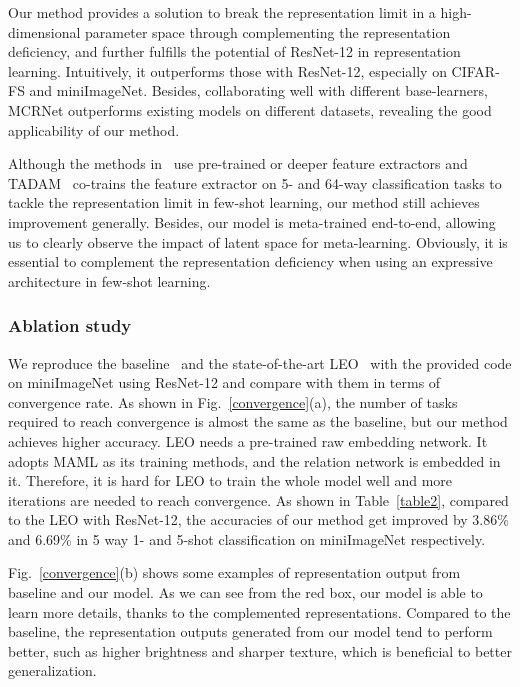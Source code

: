 \documentclass[10pt,conference,a4paper]{IEEEtran}
\begin{document}
Our method provides a solution to break the representation limit in a high-dimensional parameter space through complementing the representation deficiency, and further fulfills the potential of ResNet-12 in representation learning. Intuitively, it outperforms those with ResNet-12, especially on CIFAR-FS and miniImageNet. Besides, collaborating well with different base-learners, MCRNet outperforms existing models on different datasets, revealing the good applicability of our method.

Although the methods in~\cite{hui2019self, rusu2019meta, DBLP:conf/cvpr/GidarisK19, Sun2019Meta} use pre-trained or deeper feature extractors and TADAM~\cite{oreshkin2018tadam} co-trains the feature extractor on 5- and 64-way classification tasks to tackle the representation limit in few-shot learning, our method still achieves improvement generally. Besides, our model is meta-trained end-to-end, allowing us to clearly observe the impact of latent space for meta-learning. Obviously, it is essential to complement the representation deficiency when using an expressive architecture in few-shot learning.

\subsubsection{\textbf{Ablation study}}
We reproduce the baseline~\cite{lee2019meta} and the state-of-the-art LEO~\cite{rusu2019meta} with the provided code on miniImageNet using ResNet-12 and compare with them in terms of convergence rate. As shown in Fig.~\ref{convergence}(a), the number of tasks required to reach convergence is almost the same as the baseline, but our method achieves higher accuracy. LEO needs a pre-trained raw embedding network. It adopts MAML as its training methods, and the relation network is embedded in it. Therefore, it is hard for LEO to train the whole model well and more iterations are needed to reach convergence. As shown in Table~\ref{table2}, compared to the LEO with ResNet-12, the accuracies of our method get improved by 3.86\% and 6.69\% in 5 way 1- and 5-shot classification on miniImageNet respectively. 

Fig.~\ref{convergence}(b) shows some examples of representation output from baseline and our model. As we can see from the red box, our model is able to learn more details, thanks to the complemented representations. Compared to the baseline, the representation outputs generated from our model tend to perform better, such as higher brightness and sharper texture, which is beneficial to better generalization.
\end{document}
